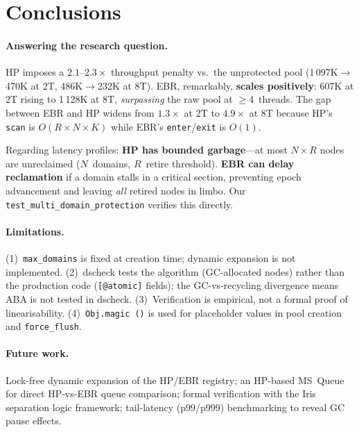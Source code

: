\documentclass[11pt,a4paper]{article}
\begin{document}
\section{Conclusions}
\label{sec:conclusions}

\paragraph{Answering the research question.}
HP imposes a $2.1$--$2.3\times$ throughput penalty vs.\ the unprotected pool
(1\,097K$\to$470K at 2T, 486K$\to$232K at 8T).  EBR, remarkably,
\textbf{scales positively}: 607K at 2T rising to 1\,128K at 8T,
\emph{surpassing} the raw pool at $\geq$4~threads.
The gap between EBR and HP widens from $1.3\times$ at 2T to $4.9\times$ at 8T
because HP's \texttt{scan} is $O(R \times N \times K)$ while EBR's
\texttt{enter}/\texttt{exit} is $O(1)$.

Regarding latency profiles: \textbf{HP has bounded garbage}---at most
$N \times R$ nodes are unreclaimed ($N$~domains, $R$~retire threshold).
\textbf{EBR can delay reclamation} if a domain stalls in a critical section,
preventing epoch advancement and leaving \emph{all} retired nodes in limbo.
Our \texttt{test\_multi\_domain\_protection} verifies this directly.

\paragraph{Limitations.}
(1)~\texttt{max\_domains} is fixed at creation time; dynamic expansion is not
implemented.
(2)~dscheck tests the algorithm (GC-allocated nodes) rather than the production
code (\texttt{[@atomic]} fields); the GC-vs-recycling divergence means ABA is
not tested in dscheck.
(3)~Verification is empirical, not a formal proof of linearisability.
(4)~\texttt{Obj.magic ()} is used for placeholder values in pool creation and
\texttt{force\_flush}.

\paragraph{Future work.}
Lock-free dynamic expansion of the HP/EBR registry; an HP-based MS~Queue for
direct HP-vs-EBR queue comparison; formal verification with the Iris separation
logic framework; tail-latency (p99/p999) benchmarking to reveal GC pause effects.
\end{document}
